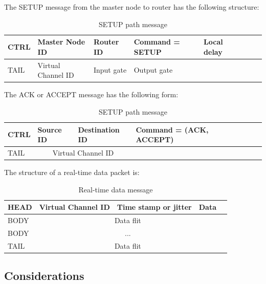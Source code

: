 \documentclass[a4]{article}
\begin{document}
The SETUP message from the master node to router has the following structure:

\begin{table}[htbp]
\begin{center}
  \begin{tabular}{ | l | l | l | l | l | l | l | l | }
    \hline
	CTRL & Master Node ID & Router ID & Command = SETUP & Local delay \\ \hline
	TAIL & Virtual Channel ID & Input gate & Output gate &  \\
    \hline
  \end{tabular}
\end{center}
\caption{SETUP path message}
\label{table:PathMsg}
\end{table}

The ACK or ACCEPT message has the following form:


\begin{table}[htbp]
\begin{center}
  \begin{tabular}{ | l | l | l | l | l | l | l | l | }
    \hline
	CTRL & Source ID & Destination ID & Command = (ACK, ACCEPT) \\ \hline
	TAIL & \multicolumn{2}{|c|}{Virtual Channel ID} &  \\
    \hline
  \end{tabular}
\end{center}
\caption{SETUP path message}
\label{table:PathMsg}
\end{table}


The structure of a real-time data packet is:

\begin{table}[htbp]
\begin{center}
  \begin{tabular}{ | l | l | l | l | l |}
    \hline
	HEAD & Virtual Channel ID & Time stamp or jitter & Data \\ \hline 
	BODY & \multicolumn{3}{|c|}{Data flit} \\ \hline
	BODY &\multicolumn{3}{|c|}{...} \\ \hline
	TAIL & \multicolumn{3}{|c|}{Data flit} \\
    \hline
  \end{tabular}
\end{center}
\caption{Real-time data message}
\label{table:DataMsg}
\end{table}

\subsection{Considerations}
\end{document}
